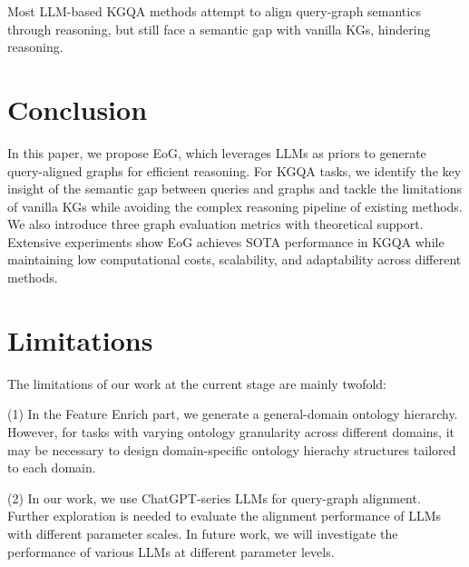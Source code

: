 \documentclass[11pt]{article}
\begin{document}
Most LLM-based KGQA methods attempt to align query-graph semantics through reasoning, but still face a semantic gap with vanilla KGs, hindering reasoning.


\section{Conclusion}
In this paper, we propose EoG, which leverages LLMs as priors to generate query-aligned graphs for efficient reasoning. For KGQA tasks, we identify the key insight of the semantic gap between queries and graphs and tackle the limitations of vanilla KGs while avoiding the complex reasoning pipeline of existing methods. We also introduce three graph evaluation metrics with theoretical support. Extensive experiments show EoG achieves SOTA performance in KGQA while maintaining low computational costs, scalability, and adaptability across different methods.
\section*{Limitations}
The limitations of our work at the current stage are mainly twofold:

(1) In the Feature Enrich part, we generate a general-domain ontology hierarchy. However, for tasks with varying ontology granularity across different domains, it may be necessary to design domain-specific ontology hierachy structures tailored to each domain.

(2) In our work, we use ChatGPT-series LLMs for query-graph alignment. Further exploration is needed to evaluate the alignment performance of LLMs with different parameter scales. In future work, we will investigate the performance of various LLMs at different parameter levels.

%
\end{document}
